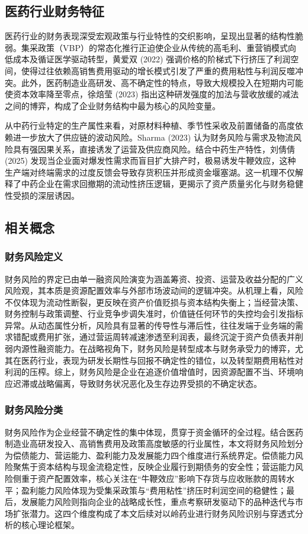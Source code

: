\documentclass[12pt,a4paper,fontset=windows,UTF8]{ctexart}
\begin{document}
\subsection{医药行业财务特征}
医药行业的财务表现深受宏观政策与行业特性的交织影响，呈现出显著的结构性脆弱。集采政策（VBP）的常态化推行正迫使企业从传统的高毛利、重营销模式向低成本及循证医学驱动转型，黄爱双 (2022) 强调价格的阶梯式下行挤压了利润空间，使得过往依赖高销售费用驱动的增长模式引发了严重的费用粘性与利润反噬冲突。此外，医药制造业高研发、高不确定性的特点，导致大规模投入在短期内可能使资本效率降至零点，徐焙莹 (2023) 指出这种研发强度的加法与营收放缓的减法之间的博弈，构成了企业财务结构中最为核心的风险变量。

从中药行业特定的生产属性来看，对原材料种植、季节性采收及前置储备的高度依赖进一步放大了供应链的波动风险。Sharma (2023) 认为财务风险与需求及物流风险具有强因果关系，直接诱发了运营及供应商风险。结合中药生产特性，刘倩倩 (2025) 发现当企业面对爆发性需求而盲目扩大排产时，极易诱发牛鞭效应，这种生产端对终端需求的过度反馈会导致存货积压并形成资金堰塞湖。这一机理不仅解释了中药企业在需求回撤期的流动性挤压逻辑，更揭示了资产质量劣化与财务稳健性受损的深层诱因。

\subsection{相关概念}
\subsubsection{财务风险定义}
财务风险的界定已由单一融资风险演变为涵盖筹资、投资、运营及收益分配的广义风险观，其本质是资源配置效率与外部市场波动间的逻辑冲突。从机理上看，风险不仅体现为流动性断裂，更反映在资产价值贬损与资本结构失衡上；当经营决策、财务控制与政策调整、行业竞争步调失准时，价值链任何环节的失控均会引发指标异常。从动态属性分析，风险具有显著的传导性与滞后性，往往发端于业务端的需求错配或费用扩张，通过营运周转减速渗透至利润表，最终沉淀于资产负债表并削弱内源性融资能力。在战略视角下，财务风险是转型成本与财务承受力的博弈，尤其在医药行业，表现为研发长期性与回报不确定性的错位，以及转型期费用粘性对利润的压榨。综上，财务风险是企业在追逐价值增值时，因资源配置不当、环境响应迟滞或战略偏离，导致财务状况恶化及生存边界受损的不确定状态。

\subsubsection{财务风险分类}
财务风险作为企业经营不确定性的集中体现，贯穿于资金循环的全过程。结合医药制造业高研发投入、高销售费用及政策高度敏感的行业属性，本文将财务风险划分为偿债能力、营运能力、盈利能力及发展能力四个维度进行系统界定。偿债能力风险聚焦于资本结构与现金流稳定性，反映企业履行到期债务的安全性；营运能力风险侧重于资产配置效率，核心关注在“牛鞭效应”影响下存货与应收账款的周转水平；盈利能力风险体现为受集采政策与“费用粘性”挤压时利润空间的稳健性；最后，发展能力风险则指向企业的战略成长性，重点考察研发驱动下的品种迭代与市场扩张潜力。这四个维度构成了本文后续对以岭药业进行财务风险识别与穿透式分析的核心理论框架。
\end{document}
